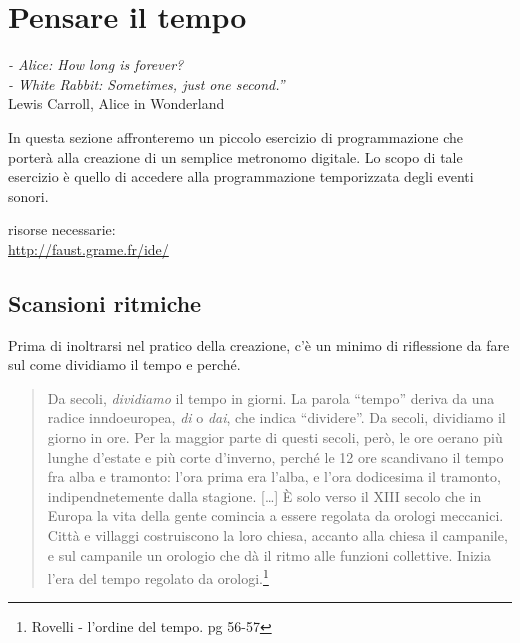 
\chapter{Pensare il tempo}

\begin{flushright}
\textit{- Alice: How long is forever?\\
- White Rabbit: Sometimes, just one second.”}\\
Lewis Carroll, Alice in Wonderland
\end{flushright}

In questa sezione affronteremo un piccolo esercizio di programmazione che porterà
alla creazione di un semplice metronomo digitale. Lo scopo di tale esercizio è
quello di accedere alla programmazione temporizzata degli eventi sonori.

risorse necessarie:\\
\url{http://faust.grame.fr/ide/}

\startcontents[chapters]

\section{Scansioni ritmiche}

Prima di inoltrarsi nel pratico della creazione, c'è un minimo di riflessione da
fare sul come dividiamo il tempo e perché.

\begin{quote}
Da secoli, \emph{dividiamo} il tempo in giorni. La parola “tempo” deriva da una
radice inndoeuropea, \emph{di} o \emph{dai}, che indica “dividere”. Da secoli,
dividiamo il giorno in ore. Per la maggior parte di questi secoli, però, le ore
oerano più lunghe d'estate e più corte d'inverno, perché le 12 ore scandivano il
tempo fra alba e tramonto: l'ora prima era l'alba, e l'ora dodicesima il tramonto,
indipendnetemente dalla stagione. [\ldots] È solo verso il XIII secolo che in Europa
la vita della gente comincia a essere regolata da orologi meccanici. Città e
villaggi costruiscono la loro chiesa, accanto alla chiesa il campanile, e sul
campanile un orologio che dà il ritmo alle funzioni collettive. Inizia l'era del
tempo regolato da orologi.\footnote{Rovelli - l'ordine del tempo. pg 56-57}
\end{quote}


